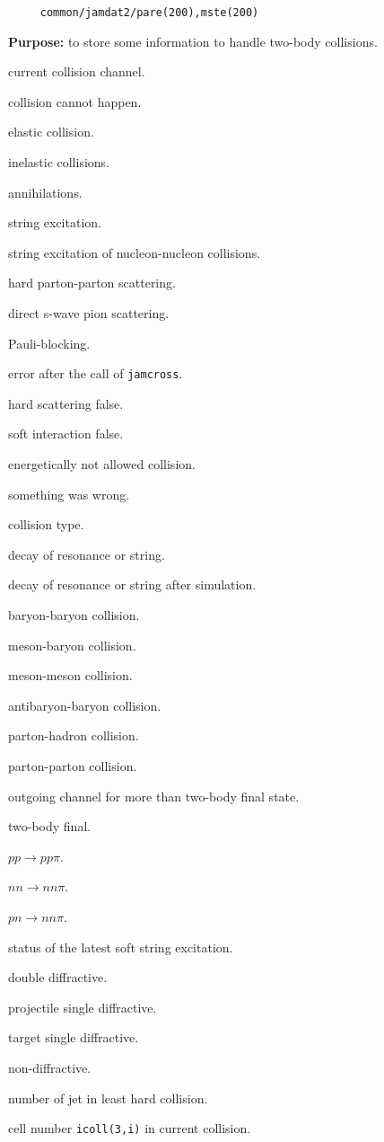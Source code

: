 \documentclass[]{article}
\newenvironment{entry}%
{\begin{list}{}{\setlength{\topsep}{0mm} \setlength{\itemsep}{0mm}
\setlength{\parskip}{0mm} \setlength{\parsep}{0mm}
\setlength{\leftmargin}{20mm} \setlength{\rightmargin}{0mm}
\setlength{\labelwidth}{18mm} \setlength{\labelsep}{2mm}}}%
{\end{list}}
\newenvironment{subentry}%
{\begin{list}{}{\setlength{\topsep}{0mm} \setlength{\itemsep}{0mm}
\setlength{\parskip}{0mm} \setlength{\parsep}{0mm}
\setlength{\leftmargin}{10mm} \setlength{\rightmargin}{0mm}
\setlength{\labelwidth}{18mm} \setlength{\labelsep}{2mm}}}%
{\end{list}}
\newcommand{\ttt}[1]{{\tt#1}}
\newcommand{\itemt}[1]{\item[{\tt #1}\hfill]}
\begin{document}
\begin{verbatim}
     common/jamdat2/pare(200),mste(200)
\end{verbatim}
{\bf Purpose:} to store some information to handle two-body collisions.
\begin{entry}

\itemt{mste(1) :} current collision channel.
 \begin{subentry}
    \itemt{$=0$ :} collision cannot happen.
    \itemt{$=1$ :} elastic collision.
    \itemt{$=2$ :} inelastic collisions.
    \itemt{$=3$ :} annihilations.
    \itemt{$=4$ :} string excitation.
    \itemt{$=5$ :} string excitation of nucleon-nucleon collisions.
    \itemt{$=6$ :} hard parton-parton scattering.
   \itemt{$=11$ :}  direct s-wave pion scattering.
   \itemt{$= -1$ :} Pauli-blocking.
   \itemt{$= -2$ :} error after the call of \ttt{jamcross}.
   \itemt{$=-9$ :}  hard scattering false.
   \itemt{$=-77$ :} soft interaction false.
   \itemt{$=-88$ :} energetically not allowed  collision.
   \itemt{$=-99$ :} something was wrong.
 \end{subentry}

\itemt{mste(2) :} collision type.
 \begin{subentry}
         \itemt{$=-1$ :} decay of resonance or string.
         \itemt{$=-2$ :} decay of resonance or string after simulation.
         \itemt{$=1$  :} baryon-baryon collision.
         \itemt{$=2$  :} meson-baryon collision.
         \itemt{$=3$  :} meson-meson collision.
         \itemt{$=4$  :} antibaryon-baryon collision.
         \itemt{$=5$  :} parton-hadron collision.
         \itemt{$=6$  :} parton-parton collision.
 \end{subentry}
\itemt{mste(3) :} outgoing channel for more than two-body final state.
 \begin{subentry}
         \itemt{$=0$ :} two-body final.
         \itemt{$=1$ :} $pp\to pp \pi$.
         \itemt{$=2$ :} $nn\to nn \pi$.
         \itemt{$=3$ :} $pn\to nn \pi$.
 \end{subentry}
\itemt{mste(4) :} status of the latest soft string excitation.
 \begin{subentry}
        \itemt{$=1$ :} double diffractive.
	\itemt{$=2$ :} projectile single diffractive.
	\itemt{$=3$ :} target single diffractive.
	\itemt{$=4$ :} non-diffractive.
 \end{subentry}

\itemt{mste(5) :} number of jet in least hard collision.
\itemt{mste(6) :} cell number \ttt{icoll(3,i)} in current collision.


\end{entry}
\end{document}
